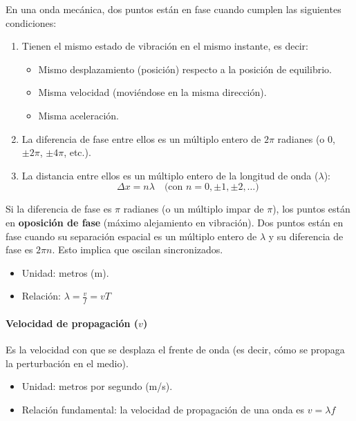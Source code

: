 En una onda mecánica, dos puntos están en fase cuando cumplen las siguientes condiciones:

\begin{enumerate}
  \item Tienen el mismo estado de vibración en el mismo instante, es decir:
    \begin{itemize}
      \item Mismo desplazamiento (posición) respecto a la posición de equilibrio.
      \item Misma velocidad (moviéndose en la misma dirección).
      \item Misma aceleración.
    \end{itemize}
  \item La diferencia de fase entre ellos es un múltiplo entero de \(2\pi\) radianes (o \(0\), \(\pm 2\pi\), \(\pm 4\pi\), etc.). 
  \item La distancia entre ellos es un múltiplo entero de la longitud de onda (\(\lambda\)):
   \[
   \Delta x = n\lambda \quad \text{(con \(n = 0, \pm 1, \pm 2, \dots\))}
   \]
\end{enumerate}

Si la diferencia de fase es \(\pi\) radianes (o un múltiplo impar de \(\pi\)), los puntos están en \textbf{oposición de fase} (máximo alejamiento en vibración). Dos puntos están en fase cuando su separación espacial es un múltiplo entero de \(\lambda\) y su diferencia de fase es \(2\pi n\). Esto implica que oscilan sincronizados.

\begin{itemize}
  \item Unidad: metros (m).
  \item Relación: \(\lambda = \frac{v}{f} = v T\)
\end{itemize}

\paragraph{Velocidad de propagación (\(v\))}

Es la velocidad con que se desplaza el frente de onda (es decir, cómo se propaga la perturbación en el medio).

\begin{itemize}
  \item Unidad: metros por segundo (m/s).
  \item Relación fundamental: la velocidad de propagación de una onda es \(v = \lambda f\)
\end{itemize}


